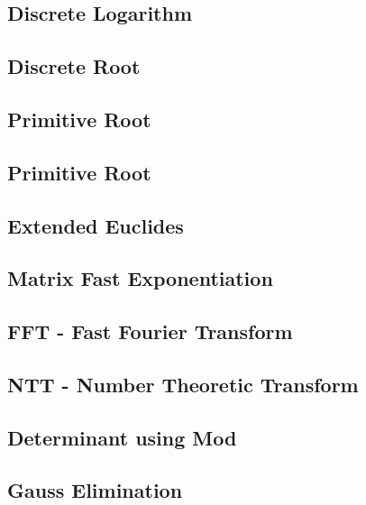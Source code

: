 \subsection{Discrete Logarithm}
\raggedbottom
\hrulefill
\subsection{Discrete Root}
\raggedbottom
\hrulefill
\subsection{Primitive Root}
\raggedbottom
\hrulefill
\subsection{Primitive Root}
\raggedbottom
\hrulefill
\subsection{Extended Euclides}
\raggedbottom
\hrulefill
\subsection{Matrix Fast Exponentiation}
\raggedbottom
\hrulefill
\subsection{FFT - Fast Fourier Transform}
\raggedbottom
\hrulefill
\subsection{NTT - Number Theoretic Transform}
\raggedbottom
\hrulefill
\subsection{Determinant using Mod}
\raggedbottom
\hrulefill
\subsection{Gauss Elimination}
\raggedbottom
\hrulefill
